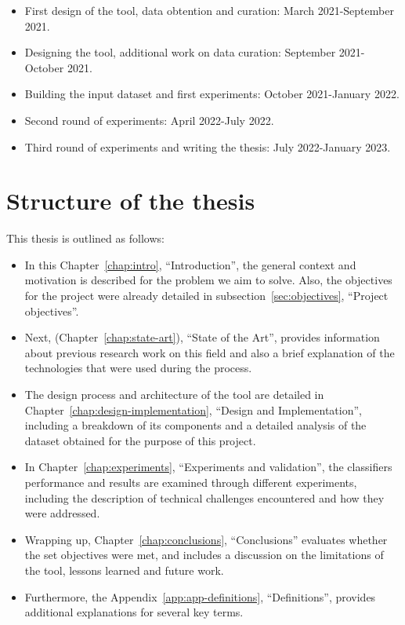 \documentclass[a4paper, 12pt]{book}
\begin{document}
\begin{itemize}
\item First design of the tool, data obtention and curation: March 2021-September 2021.
\item Designing the tool, additional work on data curation: September 2021-October 2021.
\item Building the input dataset and first experiments: October 2021-January 2022.
\item Second round of experiments: April 2022-July 2022.
\item Third round of experiments and writing the thesis: July 2022-January 2023.
\end{itemize}

\section{Structure of the thesis}
\label{sec:structure}

This thesis is outlined as follows:

\begin{itemize}
    \item In this Chapter~\ref{chap:intro}, ``Introduction'', the general context and motivation is described for the problem we aim to solve. Also, the objectives for the project were already detailed in subsection~\ref{sec:objectives}, ``Project objectives''. 
    \item Next, (Chapter~\ref{chap:state-art}), ``State of the Art'',  provides information about previous research work on this field and also a brief explanation of the technologies that were used during the process.
    \item The design process and architecture of the tool are detailed in Chapter~\ref{chap:design-implementation}, ``Design and Implementation'', including a breakdown of its components and a detailed analysis of the dataset obtained for the purpose of this project.
    \item In Chapter~\ref{chap:experiments}, ``Experiments and validation'', the classifiers performance and results are examined through different experiments, including the description of technical challenges encountered and how they were addressed.
    \item Wrapping up, Chapter~\ref{chap:conclusions}, ``Conclusions'' evaluates whether the set objectives were met, and includes a discussion on the limitations of the tool, lessons learned and future work.
    \item Furthermore, the Appendix~\ref{app:app-definitions}, ``Definitions'', provides additional explanations for several key terms.
\end{itemize}
\end{document}
